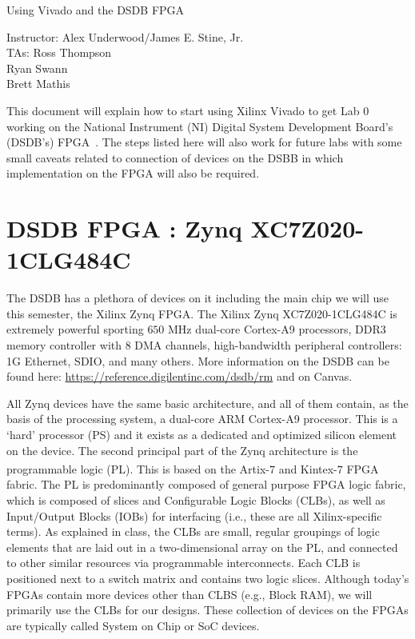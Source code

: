 \documentclass{article}
\newcommand{\myassignment}{Using Vivado and the DSDB FPGA}
\newcommand{\myinstructor}{Instructor: Alex Underwood/James E. Stine, Jr.}
\newcommand{\mytas}{TAs: Ross Thompson \\ Ryan Swann \\ Brett Mathis}
\begin{document}
\begin{center}
  {\huge \myassignment} \\
  \begin{flushright}
    \myinstructor \\
    \mytas \\
  \end{flushright}
\end{center}

This document will explain how to start using Xilinx Vivado to get Lab 0
working on the National Instrument (NI) Digital System Development
Board's (DSDB's) FPGA~\cite{dsdb1}.  The steps listed here will also work for
future labs with some small caveats related to connection of devices
on the DSBB in which implementation on the FPGA will also be required.

\section{DSDB FPGA : Zynq XC7Z020-1CLG484C}

The DSDB has a plethora of devices on it including the main chip we
will use this semester, the Xilinx Zynq FPGA.  The Xilinx Zynq
XC7Z020-1CLG484C is extremely powerful sporting  $650$ MHz
dual-core Cortex-A9 processors,  DDR3 memory controller with $8$ DMA
channels,  high-bandwidth peripheral controllers: 1G Ethernet, SDIO,
and many others.  More information on the DSDB can be found here:
\url{https://reference.digilentinc.com/dsdb/rm} and on Canvas.

All Zynq devices have the same basic architecture, and all of them
contain, as the basis of
the processing system, a dual-core ARM Cortex-A9 processor. This is a
‘hard’ processor (PS) and
it exists as a dedicated and optimized silicon element on the device.
The second principal part of the Zynq architecture is the programmable
logic (PL). This is
based on the Artix\textsuperscript{\textregistered}-$7$ and
Kintex\textsuperscript{\textregistered}-$7$ FPGA fabric.
The PL is predominantly composed of general purpose FPGA logic fabric,
which is composed of slices and Configurable Logic Blocks (CLBs), as
well as Input/Output Blocks (IOBs) for interfacing 
(i.e., these are all Xilinx-specific terms).   As explained in class,
the CLBs are small, regular groupings of logic
elements that are laid out in a two-dimensional array on the PL, and
connected to
other similar resources via programmable interconnects.
Each CLB is positioned
next to a switch matrix and contains two logic slices.  Although
today's FPGAs contain more devices other than CLBS (e.g., Block RAM),
we will primarily use the CLBs for our designs.  These collection of
devices on the FPGAs are typically called System on Chip or SoC devices.
\end{document}
